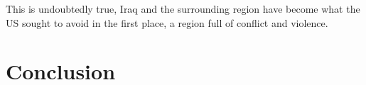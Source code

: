 \documentclass[12pt]{article}
\begin{document}
        This is undoubtedly true, Iraq and the surrounding region have become what the US sought to avoid in the first place, a region full of conflict and violence.
        
    \section{Conclusion}






\pagebreak

\printbibliography[heading=bibintoc]
\end{document}
